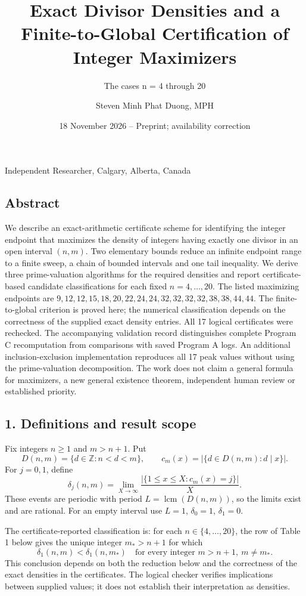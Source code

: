\documentclass[
  11pt,
]{article}
\title{Exact Divisor Densities and a Finite-to-Global Certification of
Integer Maximizers}
\subtitle{The cases n = 4 through 20}
\author{Steven Minh Phat Duong, MPH}
\date{18 November 2026 -- Preprint; availability correction}
\begin{document}
\renewcommand{\labelitemi}{$\bullet$}
\maketitle

Independent Researcher, Calgary, Alberta, Canada

\subsection{Abstract}\label{abstract}

We describe an exact-arithmetic certificate scheme for identifying the
integer endpoint that maximizes the density of integers having exactly
one divisor in an open interval \((n,m)\). Two elementary bounds reduce
an infinite endpoint range to a finite sweep, a chain of bounded
intervals and one tail inequality. We derive three prime-valuation
algorithms for the required densities and report certificate-based
candidate classifications for each fixed \(n=4,\ldots,20\). The listed
maximizing endpoints are
\(9,12,12,15,18,20,22,24,24,32,32,32,32,38,38,44,44\). The
finite-to-global criterion is proved here; the numerical classification
depends on the correctness of the supplied exact density entries. All 17
logical certificates were rechecked. The accompanying validation record
distinguishes complete Program C recomputation from comparisons with
saved Program A logs. An additional inclusion-exclusion implementation
reproduces all 17 peak values without using the prime-valuation
decomposition. The work does not claim a general formula for maximizers,
a new general existence theorem, independent human review or established
priority.

\subsection{1. Definitions and result
scope}\label{definitions-and-result-scope}

Fix integers \(n\ge1\) and \(m>n+1\). Put
\[D(n,m)=\{d\in\mathbb Z:n<d<m\},\qquad c_m(x)=|\{d\in D(n,m):d\mid x\}|.\]
For \(j=0,1\), define
\[\delta_j(n,m)=\lim_{X\to\infty}\frac{|\{1\le x\le X:c_m(x)=j\}|}{X}.\]
These events are periodic with period \(L=\operatorname{lcm}(D(n,m))\),
so the limits exist and are rational. For an empty interval use \(L=1\),
\(\delta_0=1\), \(\delta_1=0\).

The certificate-reported classification is: for each
\(n\in\{4,\ldots,20\}\), the row of Table 1 below gives the unique
integer \(m_*>n+1\) for which
\[\delta_1(n,m)<\delta_1(n,m_*)\quad\text{for every integer }m>n+1,\ m\ne m_*.\]
This conclusion depends on both the reduction below and the correctness
of the exact densities in the certificates. The logical checker verifies
implications between supplied values; it does not establish their
interpretation as densities.
\end{document}
